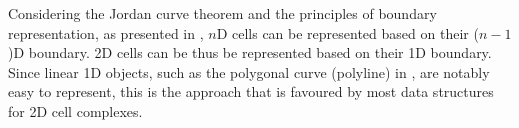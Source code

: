 Considering the Jordan curve theorem \citep{Jordan87} and the principles of boundary representation, as presented in , $n$D cells can be represented based on their ($n-1$)D boundary.
2D cells can be thus be represented based on their 1D boundary.
Since linear 1D objects, such as the polygonal curve (polyline) in , are notably easy to represent, this is the approach that is favoured by most data structures for 2D cell complexes.


